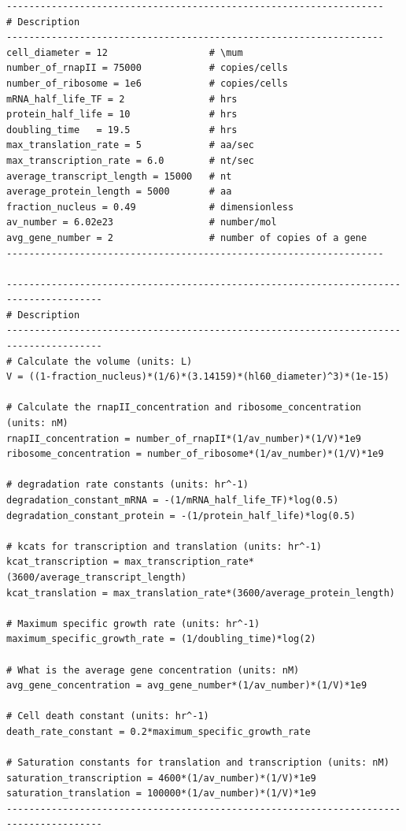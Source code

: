 \begin{lstlisting}
-------------------------------------------------------------------
# Description
-------------------------------------------------------------------
cell_diameter = 12                	# \mum
number_of_rnapII = 75000          	# copies/cells
number_of_ribosome = 1e6          	# copies/cells
mRNA_half_life_TF = 2             	# hrs
protein_half_life = 10            	# hrs
doubling_time 	= 19.5         		# hrs
max_translation_rate = 5          	# aa/sec
max_transcription_rate = 6.0       	# nt/sec
average_transcript_length = 15000 	# nt
average_protein_length = 5000     	# aa
fraction_nucleus = 0.49           	# dimensionless
av_number = 6.02e23               	# number/mol
avg_gene_number = 2               	# number of copies of a gene
-------------------------------------------------------------------

---------------------------------------------------------------------------------------
# Description
---------------------------------------------------------------------------------------
# Calculate the volume (units: L)
V = ((1-fraction_nucleus)*(1/6)*(3.14159)*(hl60_diameter)^3)*(1e-15)

# Calculate the rnapII_concentration and ribosome_concentration (units: nM)
rnapII_concentration = number_of_rnapII*(1/av_number)*(1/V)*1e9
ribosome_concentration = number_of_ribosome*(1/av_number)*(1/V)*1e9

# degradation rate constants (units: hr^-1)
degradation_constant_mRNA = -(1/mRNA_half_life_TF)*log(0.5)
degradation_constant_protein = -(1/protein_half_life)*log(0.5)

# kcats for transcription and translation (units: hr^-1)
kcat_transcription = max_transcription_rate*(3600/average_transcript_length)
kcat_translation = max_translation_rate*(3600/average_protein_length)

# Maximum specific growth rate (units: hr^-1)
maximum_specific_growth_rate = (1/doubling_time)*log(2)

# What is the average gene concentration (units: nM)
avg_gene_concentration = avg_gene_number*(1/av_number)*(1/V)*1e9

# Cell death constant (units: hr^-1)
death_rate_constant = 0.2*maximum_specific_growth_rate

# Saturation constants for translation and transcription (units: nM)
saturation_transcription = 4600*(1/av_number)*(1/V)*1e9
saturation_translation = 100000*(1/av_number)*(1/V)*1e9
---------------------------------------------------------------------------------------

\end{lstlisting}

